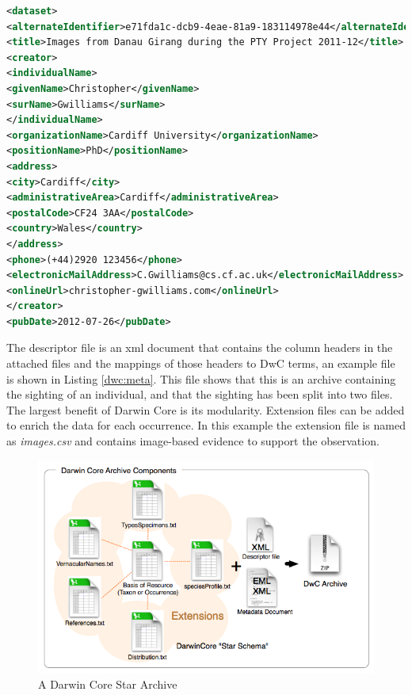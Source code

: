 % 
\begin{lstlisting}[caption=Darwin Core Ecological Metadata File, label=dwc:eml, breaklines=true, language=XML]
 <dataset>
<alternateIdentifier>e71fda1c-dcb9-4eae-81a9-183114978e44</alternateIdentifier>
<title>Images from Danau Girang during the PTY Project 2011-12</title>
<creator>
<individualName>
<givenName>Christopher</givenName>
<surName>Gwilliams</surName>
</individualName>
<organizationName>Cardiff University</organizationName>
<positionName>PhD</positionName>
<address>
<city>Cardiff</city>
<administrativeArea>Cardiff</administrativeArea>
<postalCode>CF24 3AA</postalCode>
<country>Wales</country>
</address>
<phone>(+44)2920 123456</phone>
<electronicMailAddress>C.Gwilliams@cs.cf.ac.uk</electronicMailAddress>
<onlineUrl>christopher-gwilliams.com</onlineUrl>
</creator>
<pubDate>2012-07-26</pubDate>
 \end{lstlisting}

The descriptor file is an xml document that contains the column headers in the attached files and the mappings of those headers to DwC terms, an example file is shown in Listing \ref{dwc:meta}. This file shows that this is an archive containing the sighting of an individual, and that the sighting has been split into two files. The largest benefit of Darwin Core is its modularity. Extension files can be added to enrich the data for each occurrence. In this example the extension file is named as \textit{images.csv} and contains image-based evidence to support the observation.

\noindent\begin{minipage}{\textwidth}

\end{minipage}

    \begin{figure}
    \centering
      \includegraphics[width=\textwidth]{Chap5/figures/dwca.png}
    \caption{A Darwin Core Star Archive}
    \label{dwca}
    \end{figure}

